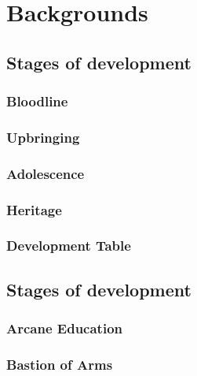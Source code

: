 \documentclass[12pt]{article}
\begin{document}
\newpage
\newpage
\newpage
\newpage
\newpage
\newpage
\newpage
\newpage
\newpage
\newpage






















	\newpage
		\newpage
	\newpage
		\newpage

\newpage
\newpage


\section{Backgrounds}




\subsection{Stages of development}
\subsubsection{Bloodline}
\subsubsection{Upbringing}
\subsubsection{Adolescence}
\subsubsection{Heritage}
\subsubsection{Development Table}
\subsection{Stages of development}
\subsubsection{Arcane Education}
\subsubsection{Bastion of Arms}
\end{document}
